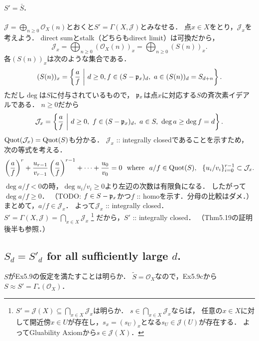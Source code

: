\documentclass[a4paper]{jsarticle}
\newcommand{\shJ}{\mathcal{J}}
\newcommand{\shO}{\mathcal{O}}
\begin{document}
    \paragraph{$S'=\bar{S}$.}
    $\shJ=\bigoplus_{n \geq 0} \shO_X(n)$とおくと$S'=\Gamma(X,\shJ)$とみなせる．
    点$x \in X$をとり，$\shJ_x$を考えよう．
    direct sumとstalk（どちらもdirect limit）は可換だから，
    \[ \shJ_x=\bigoplus_{n \geq 0} (\shO_X(n))_x=\bigoplus_{n \geq 0} (S(n))_x. \]
    各$(S(n))_x$は次のような集合である．
    \[ (S(n))_x=\left\{ \frac{a}{f} ~\middle|~ d \geq 0, f \in (S-\mathfrak{p}_x)_d,~ a \in (S(n))_{d}=S_{d+n} \right\}. \]
    ただし$\deg$は$S$に付与されているもので，
    $\mathfrak{p}_x$は点$x$に対応する$S$の斉次素イデアルである．
    $n \geq 0$だから
    \[ \shJ_x=\left\{ \frac{a}{f} ~\middle|~ d \geq 0,~ f \in (S-\I{p}_x)_d,~ a \in S,~ \deg a \geq \deg f=d \right\}. \]
    $\Quot(\shJ_x)=\Quot(S)$も分かる．
    $\shJ_x$ :: integrally closedであることを示すため，
    次の等式を考える．
    \[
        \left(\frac{a}{f}\right)^r+\frac{u_{r-1}}{v_{r-1}}\left(\frac{a}{f}\right)^{r-1}+\dots+\frac{u_0}{v_0}=0
        \mwhere
        a/f \in \Quot(S),~~ \{ u_i/v_i \}_{i=0}^{r-1} \subset \shJ_x.
    \]
    $\deg a/f<0$の時，$\deg u_i/v_i \geq 0$より左辺の次数は有限負になる．
    したがって$\deg a/f \geq 0$．
    （TODO: $f \in S-\mathfrak{p}_x$かつ$f$ :: homoを示す．分母の比較はダメ．）
    まとめて，$a/f \in \shJ_x$．
    よって$\shJ_x$ :: integrally closed．
    $S'=\Gamma(X,\shJ)=\bigcap_{x \in X} \shJ_x$
    \footnote
    {
        $S'=\shJ(X) \subseteq \bigcap_{x \in X} \shJ_x$は明らか．
        $s \in \bigcap_{x \in X} \shJ_x$ならば，
        任意の$x \in X$に対して開近傍$x \in U$が存在し，$s_x=(s_U)_x$となる$s_U \in \shJ(U)$が存在する．
        よってGluability Axiomから$s \in \shJ(X)$．
    }
    だから，$S'$ :: integrally closed．
    （Thm5.19の証明後半も参照．）

    \subsection{$S_d=S'_d$ for all sufficiently large $d$.}
    $S$がEx5.9の仮定を満たすことは明らか．
    $\tilde{S}=\shO_X$なので，Ex5.9cから$S \approx S'=\Gamma_*(\shO_X)$．
\end{document}
